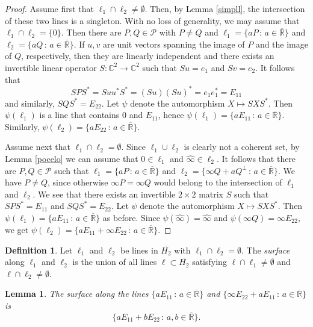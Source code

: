 \documentclass[10pt]{amsart}
\newtheorem{lemma}[theorem]{Lemma}
\theoremstyle{definition}
\newtheorem{definition}[theorem]{Definition}
\theoremstyle{remark}
\numberwithin{subsection}{section}
\numberwithin{equation}{section}
\newcommand\oH{{\overline{H_2}}}
\newcommand\oi{{\widehat{\infty}}}
\newcommand\oR{{\overline{\mathbb{R}}}}
\begin{document}
\begin{proof}
Assume first that $\ell_1 \cap \ell_2 \not=\emptyset$. Then, by Lemma \ref{simpll}, the intersection of these two lines is a singleton. With no loss of generality, we may assume that  $\ell_1 \cap \ell_2= \{ 0 \}$. Then there are $P,Q \in \mathcal{P}$ with $P \not=Q$ and $\ell_1 = 
\{ a P \, : \, a \in {\oR} \}$ and  $\ell_2 = 
\{ a Q \, : \, a \in {\oR} \}$. If $u,v$ are unit vectors spanning the image of $P$ and the image of $Q$, respectively, then they are linearly independent and there exists an invertible linear operator $S \colon \mathbb{C}^2 \to \mathbb{C}^2$ such that $Su= e_1$ and $Sv = e_2$. 
It follows that 
\[
SPS^\ast = Suu^*S^* = (Su)(Su)^* = e_1e_1^*= E_{11}
\]
and similarly, $SQS^\ast = E_{22}$. 
Let $\psi$ denote the automorphism $X\mapsto SXS^*$. 
Then $\psi(\ell_1)$ is a line that contains $0$ and $E_{11}$, hence $\psi(\ell_1)= \{ a E_{11} \, : \, a \in {\oR} \}$.
Similarly, $\psi(\ell_2) = \{ a E_{22} \, : \, a \in {\oR} \}$.

Assume next that $\ell_1 \cap \ell_2 =\emptyset$. Since $\ell_1\cup \ell_2$ is clearly not a coherent set, by Lemma \ref{pocelo} we can assume that $0 \in \ell_1$ and $\oi \in \ell_2$. It follows that there are $P,Q \in \mathcal{P}$ such that $\ell_1 = 
\{ a P \, : \, a \in {\oR} \}$ and  $\ell_2 = 
\{ \infty Q + aQ^\perp \, : \, a \in {\oR} \}$. We have $P \not=Q$, since otherwise $\infty P = \infty Q$ would belong to the intersection of $\ell_1$ and $\ell_2$. 
We see that there exists an invertible $2 \times 2$ matrix $S$ such that $SPS^\ast = E_{11}$ and $SQS^\ast = E_{22}$.
Let $\psi$ denote the automorphism $X\mapsto SXS^*$. 
Then $\psi(\ell_1) = \{ a E_{11} \, : \, a \in {\oR} \}$ as before. 
Since $\psi(\oi)=\oi$ and $\psi(\infty Q)=\infty E_{22}$, we get $\psi(\ell_2) = \{  a E_{11} +\infty E_{22}  \, : \, a \in {\oR} \}$.
\end{proof}

\begin{definition}\label{surface}
Let $\ell_1$ and $\ell_2$ be lines in $\oH$ with $\ell_1 \cap \ell_2 = \emptyset$. The \emph{surface}  along $\ell_1$ and $\ell_2$ is the union of all lines $\ell \subset \oH$ satisfying $\ell \cap \ell_1 \not= \emptyset$ and $\ell \cap \ell_2 \not= \emptyset$. 
\end{definition}

\begin{lemma}\label{standsurface}
The surface along the lines  $\{ a E_{11} \, : \, a \in {\oR} \}$ and $\{  \infty E_{22}  + a E_{11} \, : \, a \in {\oR} \}$ is
\[
\{ a E_{11} + b E_{22} \, : \, a,b \in {\oR} \}.
\]
\end{lemma}
\end{document}
